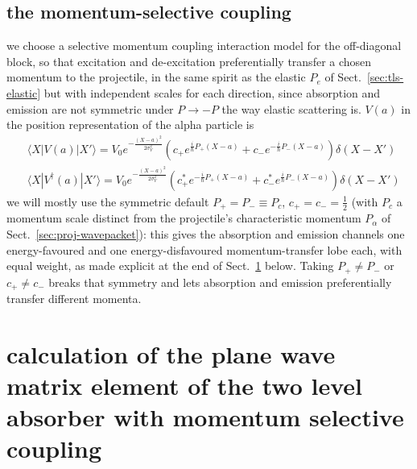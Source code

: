 \subsection{the momentum-selective coupling}\label{sec:tls-momentum-selective}
we choose a  selective momentum coupling interaction model for the off-diagonal block, so that excitation and de-excitation preferentially transfer a chosen momentum to the projectile, in the same spirit as the elastic $P_e$ of Sect.~\ref{sec:tls-elastic} but with independent scales for each direction, since absorption and emission are not symmetric under $P\to-P$ the way elastic scattering is. $V(a)$ in the position representation of the alpha particle is
\begin{align}
    &\langle X|V(a)|X'\rangle = V_0 e^{-\frac{(X-a)^2}{2\sigma_V^2}}\left(c_{+} e^{\frac{i}\hbar {P_{+}}(X-a)}+c_{-} e^{-\frac{i}\hbar P_{{-}}(X-a)}\right)\delta(X-X')\\
    &\langle X|V^\dag (a)|X'\rangle = V_0 e^{-\frac{(X-a)^2}{2\sigma_V^2}}\left(c^*_{+} e^{-\frac{i}\hbar {P_{+}}(X-a)}+c^*_{-} e^{\frac{i}\hbar P_{{-}}(X-a)}\right)\delta(X-X')
\end{align}
we will mostly use the symmetric default $P_+=P_-\equiv P_c$, $c_+=c_-=\frac12$ (with $P_c$ a momentum scale distinct from the projectile's characteristic momentum $P_\alpha$ of Sect.~\ref{sec:proj-wavepacket}): this gives the absorption and emission channels one energy-favoured and one energy-disfavoured momentum-transfer lobe each, with equal weight, as made explicit at the end of Sect.~\ref{sec:tls-matrix-element} below. Taking $P_+\ne P_-$ or $c_+\ne c_-$ breaks that symmetry and lets absorption and emission preferentially transfer different momenta.

\section{calculation of the plane wave matrix element of the two level absorber with momentum selective coupling}\label{sec:tls-matrix-element}

